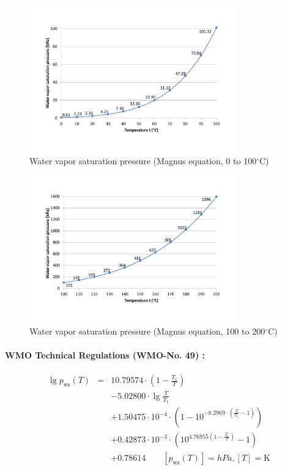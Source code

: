 \documentclass[11pt,a4paper,english,twoside]{scrreprt}
\newcommand{\gradC}{${}^\circ$C}      %
\begin{document}
\begin{figure}
  \centering
  \includegraphics*[width=0.8\textwidth,angle=0]{FCF_Diag_pws.pdf}
  \caption[Water vapor saturation pressure (Magnus equation)]{Water vapor saturation pressure (Magnus equation, 0 to 100\gradC) }
\end{figure}

\begin{figure}
  \centering
  \includegraphics*[width=0.8\textwidth,angle=0]{FCF_Diag_pws2.pdf}
  \caption[Water vapor saturation pressure (Magnus equation)]{Water vapor saturation pressure (Magnus equation, 100 to 200\gradC)}
\end{figure}

\paragraph{WMO Technical Regulations (WMO-No. 49) \cite{WMO49}:}

\begin{eqnarray}
  \lg p_\text{ws}(T) &=& 10.79574 \cdot \left(1 - \frac{T_1}{T}\right)  \\
                    & & - 5.02800 \cdot \lg \frac{T}{T_1}  \nonumber \\
                    & & + 1.50475 \cdot 10^{-4} \cdot \left(1 - 10^{-8.2969 \cdot \left(\frac{T}{T_1}-1\right)}\right) \nonumber \\
                    & & + 0.42873 \cdot 10^{-3} \cdot \left(10^{4.769 55 \left(1-\frac{T_1}{T}\right)}-1 \right) \nonumber \\
                    & & + 0.78614 \qquad [p_\text{ws}(T)] = \si{hPa}, [T] = \si{\kelvin} \nonumber
\end{eqnarray}
\end{document}
